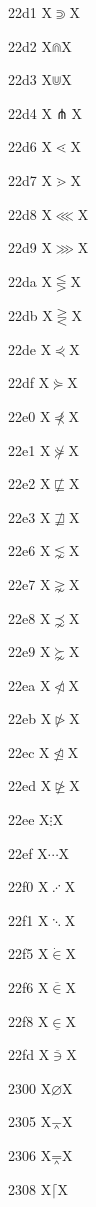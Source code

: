 \documentclass[11pt]{article}
\begin{document}
22d1 X{\ensuremath{\Supset}}X

22d2 X{\ensuremath{\Cap}}X

22d3 X{\ensuremath{\Cup}}X

22d4 X{\ensuremath{\pitchfork}}X

22d6 X{\ensuremath{\lessdot}}X

22d7 X{\ensuremath{\gtrdot}}X

22d8 X{\ensuremath{\lll}}X

22d9 X{\ensuremath{\ggg}}X

22da X{\ensuremath{\lesseqgtr}}X

22db X{\ensuremath{\gtreqless}}X

22de X{\ensuremath{\curlyeqprec}}X

22df X{\ensuremath{\curlyeqsucc}}X

22e0 X{\ensuremath{\not\curlyeqprec}}X

22e1 X{\ensuremath{\not\curlyeqsucc}}X

22e2 X{\ensuremath{\not\sqsubseteq}}X

22e3 X{\ensuremath{\not\sqsupseteq}}X

22e6 X{\ensuremath{\lnsim}}X

22e7 X{\ensuremath{\gnsim}}X

22e8 X{\ensuremath{\precnsim}}X

22e9 X{\ensuremath{\succnsim}}X

22ea X{\ensuremath{\ntriangleleft}}X

22eb X{\ensuremath{\ntriangleright}}X

22ec X{\ensuremath{\ntrianglelefteq}}X

22ed X{\ensuremath{\ntrianglerighteq}}X

22ee X{\ensuremath{\vdots}}X

22ef X{\ensuremath{\cdots}}X

22f0 X{\ensuremath{\iddots}}X

22f1 X{\ensuremath{\ddots}}X

22f5 X{\ensuremath{\dot{\in}}}X

22f6 X{\ensuremath{\overline{\in}}}X

22f8 X{\ensuremath{\underline{\in}}}X

22fd X{\ensuremath{\overline{\ni}}}X

2300 X{\ensuremath{\diameter}}X

2305 X{\ensuremath{\barwedge}}X

2306 X{\ensuremath{\doublebarwedge}}X

2308 X{\ensuremath{\lceil}}X
\end{document}
